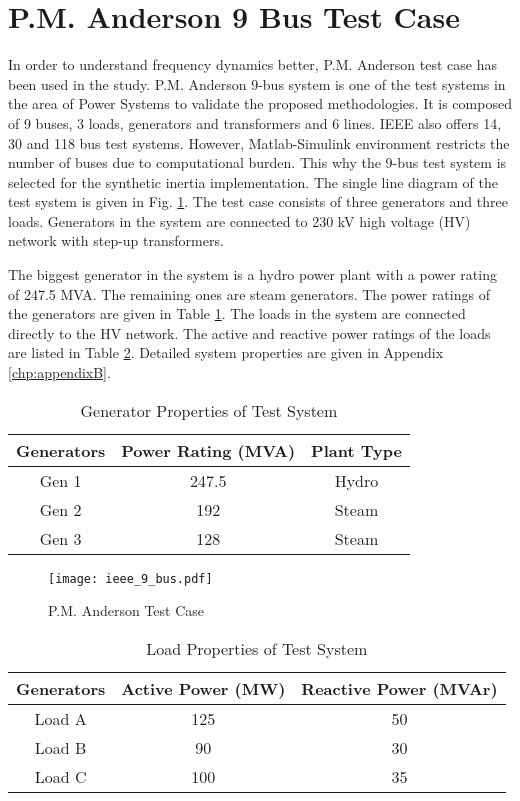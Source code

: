 \section{P.M. Anderson 9 Bus Test Case}
In order to understand frequency dynamics better, P.M. Anderson test case has been used in the study. P.M. Anderson 9-bus system is one of the test systems in the area of Power Systems to validate the proposed methodologies. It is composed of 9 buses, 3 loads, generators and transformers and 6 lines. IEEE also offers 14, 30 and 118 bus test systems. However, Matlab-Simulink environment restricts the number of buses due to computational burden. This why the 9-bus test system is selected for the synthetic inertia implementation. The single line diagram of the test system is given in Fig. \ref{ieee_9_bus}. The test case consists of three generators and three loads. Generators in the system are connected to 230 kV high voltage (HV) network with step-up transformers.\par
The biggest generator in the system is a hydro power plant with a power rating of 247.5 MVA. The remaining ones are steam generators. The power ratings of the generators are given in Table \ref{generatorproperties}. The loads in the system are connected directly to the HV network. The active and reactive power ratings of the loads are listed in Table \ref{loadproperties}. Detailed system properties are given in Appendix \ref{chp:appendixB}.
\begin{table}[h]
	\centering
	\begin{tabular}{ccc}
		\hline
		\textbf{Generators} & \textbf{Power Rating (MVA)} & \textbf{Plant Type} \\ \hline
		Gen 1               & 247.5                       & Hydro				\\
		Gen 2               & 192                         & Steam               \\
		Gen 3               & 128                         & Steam               \\ \hline
	\end{tabular}
	\caption{Generator Properties of Test System}
	\label{generatorproperties}
\end{table}
\begin{figure}[h]
	\centering
	\texttt{[image: ieee\_9\_bus.pdf]}
	\caption[P.M. Anderson Test Case]{P.M. Anderson Test Case \cite{P.M.1995}}
	\label{ieee_9_bus}
\end{figure}
\begin{table}[h!]
	\centering
	\begin{tabular}{ccc}
		\hline
		\textbf{Generators} & \textbf{Active Power (MW)}  & \textbf{Reactive Power (MVAr)} \\ \hline
		Load A              & 125                      	  & 50				 \\
		Load B              & 90                          & 30                \\
		Load C              & 100                         & 35                \\ \hline
	\end{tabular}
	\caption{Load Properties of Test System}
	\label{loadproperties}
\end{table}
